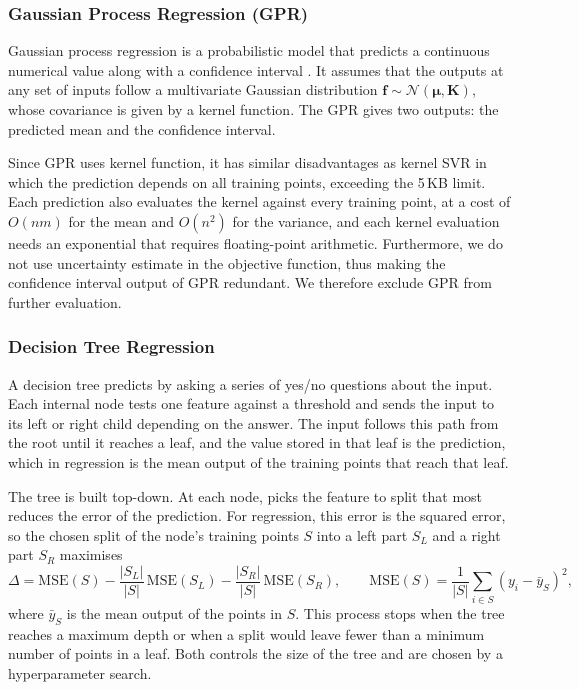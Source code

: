 \subsubsection{Gaussian Process Regression (GPR)}
Gaussian process regression is a probabilistic model that predicts a
continuous numerical value along with a confidence interval
\cite{wangIntuitiveTutorialGaussian2023}. It assumes that the outputs
at any set of inputs follow a multivariate Gaussian distribution
$\mathbf{f} \sim \mathcal{N}(\boldsymbol{\mu}, \mathbf{K})$, whose
covariance is given by a kernel function. The GPR gives two outputs:
the predicted mean and the confidence interval.

Since GPR uses kernel function, it has similar disadvantages as
kernel SVR in which the prediction depends on all training points,
exceeding the 5\,KB limit. Each prediction also evaluates the
kernel against every training point, at a cost of $O(nm)$ for the
mean and $O(n^2)$ for the variance, and each kernel evaluation needs
an exponential that requires floating-point arithmetic. Furthermore,
we do not use uncertainty estimate in the objective function, thus
making the confidence interval output of GPR redundant.
We therefore exclude GPR from further evaluation.

\subsubsection{Decision Tree Regression}
A decision tree predicts by asking a series of yes/no questions about
the input. Each internal node tests one feature against a threshold
and sends the input to its left or right child depending on the
answer. The input follows this
path from the root until it reaches a leaf, and the value stored in
that leaf is the prediction, which in regression is the mean output
of the training points that reach that leaf.

The tree is built top-down. At each node, picks the feature to split that most
reduces the error of the prediction. For regression, this error is
the squared error, so the chosen split of the node's training points
$S$ into a left part $S_L$ and a right part $S_R$ maximises
\begin{equation}
    \Delta = \mathrm{MSE}(S)
    - \frac{|S_L|}{|S|}\,\mathrm{MSE}(S_L)
    - \frac{|S_R|}{|S|}\,\mathrm{MSE}(S_R),
    \qquad
    \mathrm{MSE}(S) = \frac{1}{|S|} \sum_{i \in S}
    \left( y_i - \bar{y}_S \right)^2,
\end{equation}
where $\bar{y}_S$ is the mean output of the points in $S$. This process
stops when the tree reaches a maximum depth or when a split would
leave fewer than a minimum number of points in a leaf. Both controls
the size of the tree and are chosen by a hyperparameter search.


